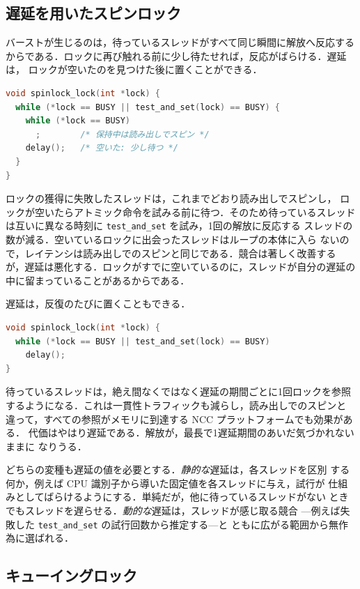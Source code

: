 \documentclass[../main.tex]{subfiles}
\begin{document}
\subsection{遅延を用いたスピンロック}

バーストが生じるのは，待っているスレッドがすべて同じ瞬間に解放へ反応する
からである．ロックに再び触れる前に少し待たせれば，反応がばらける．遅延は，
ロックが空いたのを見つけた後に置くことができる．
\begin{lstlisting}[language=C, numbers=none]
void spinlock_lock(int *lock) {
  while (*lock == BUSY || test_and_set(lock) == BUSY) {
    while (*lock == BUSY)
      ;        /* 保持中は読み出しでスピン */
    delay();   /* 空いた: 少し待つ */
  }
}
\end{lstlisting}
ロックの獲得に失敗したスレッドは，これまでどおり読み出しでスピンし，
ロックが空いたらアトミック命令を試みる前に待つ．そのため待っているスレッド
は互いに異なる時刻に \texttt{test\_and\_set} を試み，1回の解放に反応する
スレッドの数が減る．空いているロックに出会ったスレッドはループの本体に入ら
ないので，レイテンシは読み出しでのスピンと同じである．競合は著しく改善する
が，遅延は悪化する．ロックがすでに空いているのに，スレッドが自分の遅延の
中に留まっていることがあるからである．

遅延は，反復のたびに置くこともできる．
\begin{lstlisting}[language=C, numbers=none]
void spinlock_lock(int *lock) {
  while (*lock == BUSY || test_and_set(lock) == BUSY)
    delay();
}
\end{lstlisting}
待っているスレッドは，絶え間なくではなく遅延の期間ごとに1回ロックを参照
するようになる．これは一貫性トラフィックも減らし，読み出しでのスピンと
違って，すべての参照がメモリに到達する NCC プラットフォームでも効果がある．
代価はやはり遅延である．解放が，最長で1遅延期間のあいだ気づかれないままに
なりうる．

どちらの変種も遅延の値を必要とする．\emph{静的な}遅延は，各スレッドを区別
する何か，例えば CPU 識別子から導いた固定値を各スレッドに与え，試行が
仕組みとしてばらけるようにする．単純だが，他に待っているスレッドがない
ときでもスレッドを遅らせる．\emph{動的な}遅延は，スレッドが感じ取る競合
---例えば失敗した \texttt{test\_and\_set} の試行回数から推定する---と
ともに広がる範囲から無作為に選ばれる．

\subsection{キューイングロック}
\end{document}
